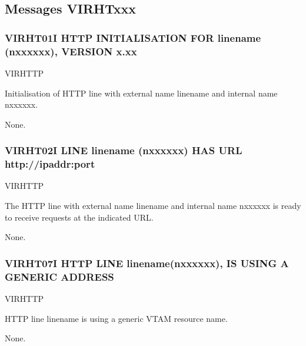 \documentclass[letterpaper,10pt,english]{sphinxmanual}
\begin{document}
\subsection{Messages VIRHTxxx}
\label{\detokenize{messages:messages-virhtxxx}}

\subsubsection{VIRHT01I HTTP INITIALISATION FOR linename (n\sphinxhyphen{}xxxxxx), VERSION x.xx}
\label{\detokenize{messages:virht01i-http-initialisation-for-linename-n-xxxxxx-version-x-xx}}\begin{description}
\sphinxAtStartPar
VIRHTTP

\sphinxAtStartPar
Initialisation of HTTP line with external name linename and internal name n\sphinxhyphen{}xxxxxx.

\sphinxAtStartPar
None.

\end{description}


\subsubsection{VIRHT02I LINE linename (n\sphinxhyphen{}xxxxxx) HAS URL http://ipaddr:port}
\label{\detokenize{messages:virht02i-line-linename-n-xxxxxx-has-url-http-ipaddr-port}}\begin{description}
\sphinxAtStartPar
VIRHTTP

\sphinxAtStartPar
The HTTP line with external name linename and internal name n\sphinxhyphen{}xxxxxx is ready to receive requests at the indicated URL.

\sphinxAtStartPar
None.

\end{description}


\subsubsection{VIRHT07I HTTP LINE linename(n\sphinxhyphen{}xxxxxx), IS USING A GENERIC ADDRESS}
\label{\detokenize{messages:virht07i-http-line-linename-n-xxxxxx-is-using-a-generic-address}}\begin{description}
\sphinxAtStartPar
VIRHTTP

\sphinxAtStartPar
HTTP line linename is using a generic VTAM resource name.

\sphinxAtStartPar
None.

\end{description}
\end{document}
